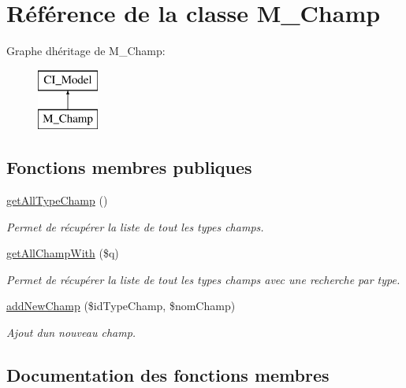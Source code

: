 \hypertarget{class_m___champ}{}\section{Référence de la classe M\+\_\+\+Champ}
\label{class_m___champ}
Graphe d\textquotesingle{}héritage de M\+\_\+\+Champ\+:\begin{figure}[H]
\begin{center}
\leavevmode
\includegraphics[height=2.000000cm]{class_m___champ}
\end{center}
\end{figure}
\subsection*{Fonctions membres publiques}
\begin{DoxyCompactItemize}
\item 
\hyperlink{class_m___champ_a456356fe964c5205fc9ff2023321d141}{get\+All\+Type\+Champ} ()
\begin{DoxyCompactList}\small\item\em Permet de récupérer la liste de tout les types champs. \end{DoxyCompactList}\item 
\hyperlink{class_m___champ_a62e1b1a0188829064f061b52decba9d3}{get\+All\+Champ\+With} (\$q)
\begin{DoxyCompactList}\small\item\em Permet de récupérer la liste de tout les types champs avec une recherche par type. \end{DoxyCompactList}\item 
\hyperlink{class_m___champ_aa709b05e9716b1c7120b602115703e71}{add\+New\+Champ} (\$id\+Type\+Champ, \$nom\+Champ)
\begin{DoxyCompactList}\small\item\em Ajout d\textquotesingle{}un nouveau champ. \end{DoxyCompactList}\end{DoxyCompactItemize}


\subsection{Documentation des fonctions membres}
\mbox{\label{class_m___champ_aa709b05e9716b1c7120b602115703e71}} 
